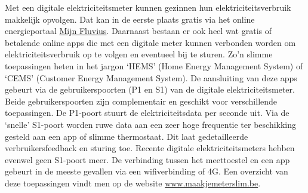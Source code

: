 Met een digitale elektriciteitsmeter kunnen gezinnen hun elektriciteitsverbruik makkelijk opvolgen. Dat kan in de eerste plaats gratis via het online energieportaal \href{https://login.fluvius.be/klanten.onmicrosoft.com/b2c_1a_customer_signup_signin/oauth2/v2.0/authorize?client_id=91bb9a0a-f45d-491a-ae0b-43324fbc343a&scope=openid%20profile%20offline_access&redirect_uri=https%3A%2F%2Fmijn.fluvius.be%2Fredirect&client-request-id=90c12c72-7d7b-428b-98fc-5d7956e53a60&response_mode=fragment&response_type=code&x-client-SKU=msal.js.browser&x-client-VER=2.23.0&client_info=1&code_challenge=jz-1E8AwB15UEa352eC_5x6zDtAtwp3Je6jrFVdGKjk&code_challenge_method=S256&nonce=cee3d720-d931-4b13-b0b5-c473169ca6fd&state=eyJpZCI6IjRhM2I3M2NkLTgyZjgtNDFjOC05NzAyLTEwMTNjNjNkNjNhMyIsIm1ldGEiOnsiaW50ZXJhY3Rpb25UeXBlIjoicmVkaXJlY3QifX0%3D}{Mijn Fluvius}. Daarnaast bestaan er ook heel wat gratis of betalende online apps die met een digitale meter kunnen verbonden worden om elektriciteitsverbruik op te volgen en eventueel bij te sturen. Zo’n slimme toepassingen heten in het jargon ‘HEMS’ (Home Energy Management System) of ‘CEMS’ (Customer Energy Management System). De aansluiting van deze apps gebeurt via de gebruikerspoorten (P1 en S1) van de digitale elektriciteitsmeter. Beide gebruikerspoorten zijn complementair en geschikt voor verschillende toepassingen. De P1-poort stuurt de elektriciteitsdata per seconde uit. Via de ‘snelle’ S1-poort worden ruwe data aan een zeer hoge frequentie ter beschikking gesteld aan een app of slimme thermostaat. Dit laat gedetailleerde verbruikersfeedback en sturing toe. Recente digitale elektriciteitsmeters hebben evenwel geen S1-poort meer. De verbinding tussen het meettoestel en een app gebeurt in de meeste gevallen via een wifiverbinding of 4G. Een overzicht van deze toepassingen vindt men op de website \href{https://maakjemeterslim.be/}{www.maakjemeterslim.be}.

\section{}%
\label{sec:overzicht functionaliteiten bestaande apps}

